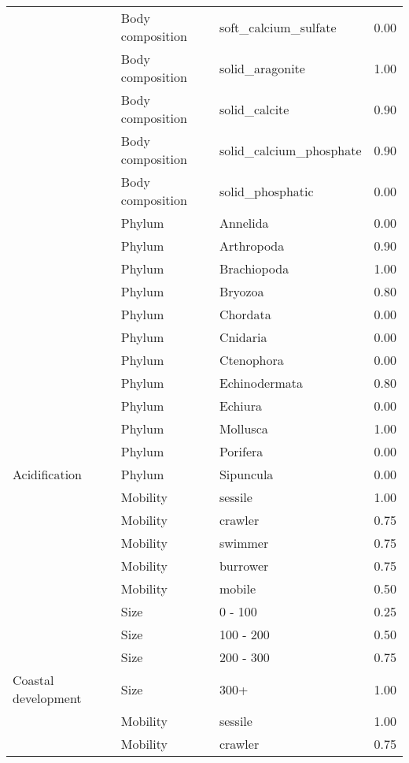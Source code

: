 \documentclass[
  12pt,
]{article}
\begin{document}
\begin{longtable}{llll}
\cmidrule{2-4}
 & Body composition & soft\_calcium\_sulfate & 0.00\\
\cmidrule{2-4}
 & Body composition & solid\_aragonite & 1.00\\
\cmidrule{2-4}
 & Body composition & solid\_calcite & 0.90\\
\cmidrule{2-4}
 & Body composition & solid\_calcium\_phosphate & 0.90\\
\cmidrule{2-4}
 & Body composition & solid\_phosphatic & 0.00\\
\cmidrule{2-4}
 & Phylum & Annelida & 0.00\\
\cmidrule{2-4}
 & Phylum & Arthropoda & 0.90\\
\cmidrule{2-4}
 & Phylum & Brachiopoda & 1.00\\
\cmidrule{2-4}
 & Phylum & Bryozoa & 0.80\\
\cmidrule{2-4}
 & Phylum & Chordata & 0.00\\
\cmidrule{2-4}
 & Phylum & Cnidaria & 0.00\\
\cmidrule{2-4}
 & Phylum & Ctenophora & 0.00\\
\cmidrule{2-4}
 & Phylum & Echinodermata & 0.80\\
\cmidrule{2-4}
 & Phylum & Echiura & 0.00\\
\cmidrule{2-4}
 & Phylum & Mollusca & 1.00\\
\cmidrule{2-4}
 & Phylum & Porifera & 0.00\\
\cmidrule{2-4}
\multirow{-36}{*}{\raggedright\arraybackslash Acidification} & Phylum & Sipuncula & 0.00\\
\cmidrule{1-4}
 & Mobility & sessile & 1.00\\
\cmidrule{2-4}
 & Mobility & crawler & 0.75\\
\cmidrule{2-4}
 & Mobility & swimmer & 0.75\\
\cmidrule{2-4}
 & Mobility & burrower & 0.75\\
\cmidrule{2-4}
 & Mobility & mobile & 0.50\\
\cmidrule{2-4}
 & Size & 0 - 100 & 0.25\\
\cmidrule{2-4}
 & Size & 100 - 200 & 0.50\\
\cmidrule{2-4}
 & Size & 200 - 300 & 0.75\\
\cmidrule{2-4}
\multirow{-9}{*}{\raggedright\arraybackslash Coastal development} & Size & 300+ & 1.00\\
\cmidrule{1-4}
 & Mobility & sessile & 1.00\\
\cmidrule{2-4}
 & Mobility & crawler & 0.75\\

\end{longtable}
\end{document}
